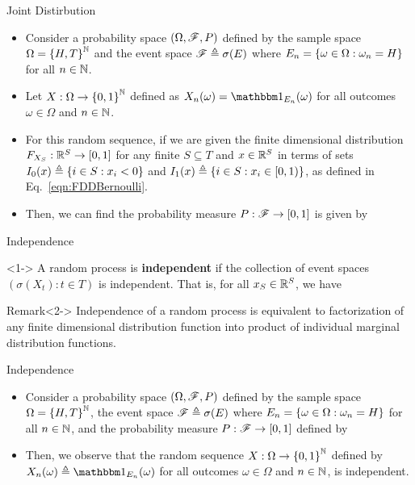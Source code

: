 \documentclass[12pt,aspectratio=169]{beamer}
\begin{document}
\begin{frame}{Joint Distirbution}
\begin{Example}
\begin{itemize}
\item <1-> Consider a probability space $(\Omega,\mathscr{F}, P)$ defined by the sample space $\Omega = \left\{H,T\right\}^{\mathbb{N}}$ and the event space $\mathscr{F} \triangleq \sigma(E)$ where $E_n = \left\{\omega \in \Omega: \omega_n = H\right\}$ for all $n\in\mathbb{N}$. 
\item <2-> Let $X: \Omega\to\left\{0,1\right\}^{\mathbb{N}}$ defined as $X_n(\omega) = \Ind{E_n}(\omega)$ for all outcomes $\omega \in \Omega$ and $n \in \mathbb{N}$. 
\item <3-> For this random sequence, if we are given the finite dimensional distribution $F_{X_S}: \mathbb{R}^S \to [0,1]$ for any finite $S \subseteq T$ and $x \in \mathbb{R}^S$ in terms of sets $ I_0(x) \triangleq \left\{i \in S: x_i < 0\right\}$ and $I_1(x) \triangleq \left\{i \in S: x_i \in [0,1)\right\}$, 
as defined in Eq.~\eqref{eqn:FDDBernoulli}. 
\item <4-> Then, we can find the probability measure $P: \mathscr{F} \to [0,1]$ is given by 
\end{itemize}
\end{Example}
\end{frame}

\begin{frame}{Independence}
\begin{Definition} <1->
A random process is \textbf{independent} if the collection of event spaces $(\sigma(X_t): t \in T)$ is independent. 
That is, for all $x_S \in \mathbb{R}^S$, we have 
\end{Definition}

\begin{block}{Remark}<2->
Independence of a random process is equivalent to factorization of any finite dimensional distribution function into product of individual marginal distribution functions.
\end{block}
\end{frame}

\begin{frame}{Independence}
\begin{Example}
\begin{itemize}
\item <1-> Consider a probability space $(\Omega,\mathscr{F}, P)$ defined by the sample space $\Omega = \left\{H,T\right\}^{\mathbb{N}}$, the event space $\mathscr{F} \triangleq \sigma(E)$ where $E_n = \left\{\omega \in \Omega: \omega_n = H\right\}$ for all $n\in\mathbb{N}$, 
and the probability measure $P: \mathscr{F} \to [0,1]$ defined by 
\item <2-> Then, we observe that the random sequence $X: \Omega\to\left\{0,1\right\}^{\mathbb{N}}$ defined by $X_n(\omega) \triangleq \Ind{E_n}(\omega)$ for all outcomes $\omega \in \Omega$ and $n \in \mathbb{N}$, is independent.
\end{itemize}
\end{Example}
\end{frame}
\end{document}
